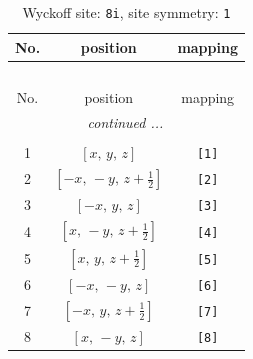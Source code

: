\documentclass[fleqn,8pt]{jsarticle}
\begin{document}
\renewcommand{\arraystretch}{1.2}
\begin{longtable}{ccc}
\caption{Wyckoff site: {\tt 8i}, site symmetry: {\tt 1}}
 \\
 \hline \hline
No. & position & mapping \\ \hline \endfirsthead

\multicolumn{2}{l}{\tablename\ \thetable{}} \\
 \hline \hline
No. & position & mapping \\ \hline \endhead

 \hline \hline
\multicolumn{2}{r}{\footnotesize\it continued ...} \\ \endfoot

 \hline \hline
\multicolumn{2}{r}{} \\ \endlastfoot

1 & $\left[ x,\, y,\, z \right]$ & {\tt [1]} \\ \hline
2 & $\left[ - x,\, - y,\, z + \frac{1}{2} \right]$ & {\tt [2]} \\ \hline
3 & $\left[ - x,\, y,\, z \right]$ & {\tt [3]} \\ \hline
4 & $\left[ x,\, - y,\, z + \frac{1}{2} \right]$ & {\tt [4]} \\ \hline
5 & $\left[ x,\, y,\, z + \frac{1}{2} \right]$ & {\tt [5]} \\ \hline
6 & $\left[ - x,\, - y,\, z \right]$ & {\tt [6]} \\ \hline
7 & $\left[ - x,\, y,\, z + \frac{1}{2} \right]$ & {\tt [7]} \\ \hline
8 & $\left[ x,\, - y,\, z \right]$ & {\tt [8]} \\
\end{longtable}
\end{document}

